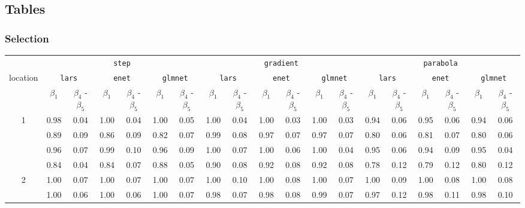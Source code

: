 \documentclass[authoryear, review, 11pt]{elsarticle}
\begin{document}
	\subsection{Tables}
		\subsubsection{Selection}
		\begin{table}		
		\begin{center}
		\begin{tabular}{ccc|cc|cc|cc|cc|cc|cc|cc|cc}
		& \multicolumn{6}{c}{\texttt{step}} & \multicolumn{6}{c}{\texttt{gradient}} & \multicolumn{6}{c}{\texttt{parabola}} \\
		location & \multicolumn{2}{c}{\texttt{lars}} & \multicolumn{2}{c}{\texttt{enet}} & \multicolumn{2}{c|}{\texttt{glmnet}} & \multicolumn{2}{c}{\texttt{lars}} & \multicolumn{2}{c}{\texttt{enet}} & \multicolumn{2}{c|}{\texttt{glmnet}}  & \multicolumn{2}{c}{\texttt{lars}} & \multicolumn{2}{c}{\texttt{enet}} & \multicolumn{2}{c}{\texttt{glmnet}}  \\
		& $\beta_1$ & $\beta_4$ - $\beta_5$ & $\beta_1$ & $\beta_4$ - $\beta_5$ & $\beta_1$ & $\beta_4$ - $\beta_5$ & $\beta_1$ & $\beta_4$ - $\beta_5$ & $\beta_1$ & $\beta_4$ - $\beta_5$ & $\beta_1$ & $\beta_4$ - $\beta_5$  & $\beta_1$ & $\beta_4$ - $\beta_5$ & $\beta_1$ & $\beta_4$ - $\beta_5$ & $\beta_1$ & $\beta_4$ - $\beta_5$ \\ 
		  \cline{2-19}
		  \multirow{4}{*}{1}& 0.98 & 0.04 & 1.00 & 0.04 & 1.00 & 0.05 & 1.00 & 0.04 & 1.00 & 0.03 & 1.00 & 0.03 & 0.94 & 0.06 & 0.95 & 0.06 & 0.94 & 0.06 \\ 
		  & 0.89 & 0.09 & 0.86 & 0.09 & 0.82 & 0.07 & 0.99 & 0.08 & 0.97 & 0.07 & 0.97 & 0.07 & 0.80 & 0.06 & 0.81 & 0.07 & 0.80 & 0.06 \\ 
		  & 0.96 & 0.07 & 0.99 & 0.10 & 0.96 & 0.09 & 1.00 & 0.07 & 1.00 & 0.06 & 1.00 & 0.04 & 0.95 & 0.06 & 0.94 & 0.09 & 0.95 & 0.04 \\ 
		  & 0.84 & 0.04 & 0.84 & 0.07 & 0.88 & 0.05 & 0.90 & 0.08 & 0.92 & 0.08 & 0.92 & 0.08 & 0.78 & 0.12 & 0.79 & 0.12 & 0.80 & 0.12\\ 
		  \cline{2-19}
		  \multirow{4}{*}{2} & 1.00 & 0.07 & 1.00 & 0.07 & 1.00 & 0.07 & 1.00 & 0.10 & 1.00 & 0.08 & 1.00 & 0.07 & 1.00 & 0.09 & 1.00 & 0.08 & 1.00 & 0.08 \\ 
		  & 1.00 & 0.06 & 1.00 & 0.06 & 1.00 & 0.07 & 0.98 & 0.07 & 0.98 & 0.08 & 0.99 & 0.07 & 0.97 & 0.12 & 0.98 & 0.11 & 0.98 & 0.10 \\ 

\end{tabular}
\end{center}
\end{table}
\end{document}
